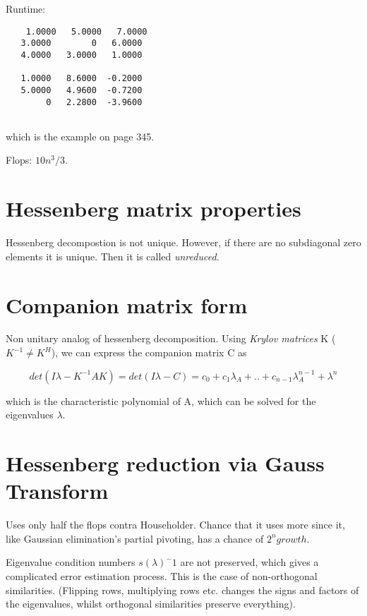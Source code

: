 \documentclass[a4paper,10pt]{article}
\begin{document}
Runtime:

\begin{verbatim}
    1.0000   5.0000   7.0000
   3.0000        0   6.0000
   4.0000   3.0000   1.0000

   1.0000   8.6000  -0.2000
   5.0000   4.9600  -0.7200
        0   2.2800  -3.9600


\end{verbatim}

which is the example on page 345.

Flops: $10n^3/3$.


\section*{Hessenberg matrix properties}

Hessenberg decompostion is not unique. However, if there are no subdiagonal zero elements it is unique. Then it is called \textit{unreduced.}

\section*{Companion matrix form}

Non unitary analog of hessenberg decomposition. Using \textit{Krylov matrices} K ($K^{-1}\ne K^H $), we can express the companion matrix C as

$$det(I\lambda - K^{-1}AK) = det(I\lambda - C) = c_0 + c_1\lambda_A + .. + c_{n-1}\lambda_A^{n-1} + \lambda^n$$

which is the characteristic polynomial of A, which can be solved for the eigenvalues $\lambda$.

\section*{Hessenberg reduction via Gauss Transform}

Uses only half the flops contra Householder. Chance that it uses more since it, like Gaussian elimination's partial pivoting, has a chance of $2^n growth$. 

Eigenvalue condition numbers $s(\lambda)^-1$ are not preserved, which gives a complicated error estimation process. This is the case of non-orthogonal similarities. (Flipping rows, multiplying rows etc. changes the signs and factors of the eigenvalues, whilst orthogonal similarities preserve everything).
\end{document}
